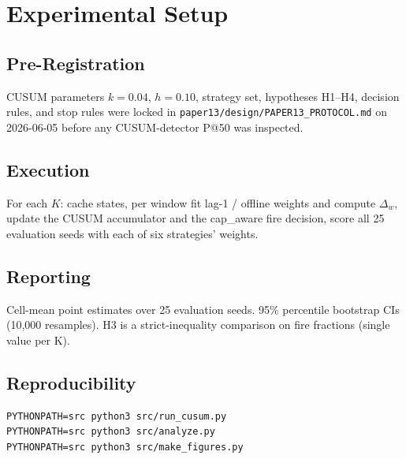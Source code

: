 \section{Experimental Setup}

\subsection{Pre-Registration}

CUSUM parameters $k = 0.04$, $h = 0.10$, strategy set, hypotheses
H1--H4, decision rules, and stop rules were locked in
\texttt{paper13/design/PAPER13\_PROTOCOL.md} on 2026-06-05 before
any CUSUM-detector P@50 was inspected.

\subsection{Execution}

For each $K$: cache states, per window fit lag-1 / offline weights
and compute $\Delta_w$, update the CUSUM accumulator and the
cap\_aware fire decision, score all 25 evaluation seeds with each
of six strategies' weights.

\subsection{Reporting}

Cell-mean point estimates over 25 evaluation seeds. 95\% percentile
bootstrap CIs (10{,}000 resamples). H3 is a strict-inequality
comparison on fire fractions (single value per K).

\subsection{Reproducibility}

{\small\begin{verbatim}
PYTHONPATH=src python3 src/run_cusum.py
PYTHONPATH=src python3 src/analyze.py
PYTHONPATH=src python3 src/make_figures.py
\end{verbatim}}
